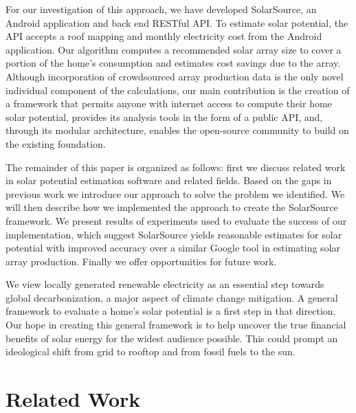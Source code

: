 \documentclass[pageno]{jpaper}
\begin{document}
For our investigation of this approach, we have developed SolarSource, an Android application and back end RESTful API. To estimate solar potential, the API accepts a roof mapping and monthly electricity cost from the Android application. Our algorithm computes a recommended solar array size to cover a portion of the home's consumption and estimates cost savings due to the array. Although incorporation of crowdsourced array production data is the only novel individual component of the calculations, our main contribution is the creation of a framework that permits anyone with internet access to compute their home solar potential, provides its analysis tools in the form of a public API, and, through its modular architecture, enables the open-source community to build on the existing foundation.

The remainder of this paper is organized as follows: first we discuss related work in solar potential estimation software and related fields. Based on the gaps in previous work we introduce our approach to solve the problem we identified. We will then describe how we implemented the approach to create the SolarSource framework. We present results of experiments used to evaluate the success of our implementation, which suggest SolarSource yields reasonable estimates for solar potential with improved accuracy over a similar Google tool in estimating solar array production. Finally we offer opportunities for future work.

We view locally generated renewable electricity as an essential step towards global decarbonization, a major aspect of climate change mitigation. A general framework to evaluate a home's solar potential is a first step in that direction. Our hope in creating this general framework is to help uncover the true financial benefits of solar energy for the widest audience possible. This could prompt an ideological shift from grid to rooftop and from fossil fuels to the sun.

\bigskip
\bigskip

\section{Related Work}
\end{document}
